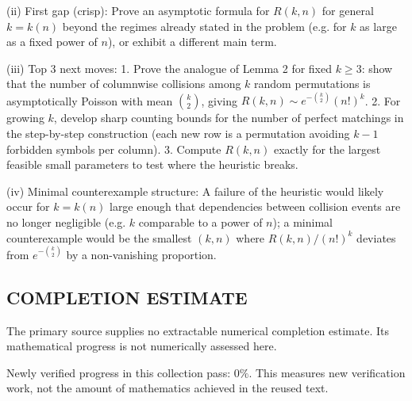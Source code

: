 (ii) First gap (crisp): Prove an asymptotic formula for $R(k,n)$ for general $k=k(n)$ beyond the regimes already stated in the problem (e.g. for $k$ as large as a fixed power of $n$), or exhibit a different main term.

(iii) Top 3 next moves:
  1. Prove the analogue of Lemma 2 for fixed $k\ge 3$: show that the number of columnwise collisions among $k$ random permutations is asymptotically Poisson with mean $\binom{k}{2}$, giving $R(k,n)\sim e^{-\binom{k}{2}}(n!)^k$.
  2. For growing $k$, develop sharp counting bounds for the number of perfect matchings in the step-by-step construction (each new row is a permutation avoiding $k-1$ forbidden symbols per column).
  3. Compute $R(k,n)$ exactly for the largest feasible small parameters to test where the heuristic breaks.

(iv) Minimal counterexample structure: A failure of the heuristic would likely occur for $k=k(n)$ large enough that dependencies between collision events are no longer negligible (e.g. $k$ comparable to a power of $n$); a minimal counterexample would be the smallest $(k,n)$ where $R(k,n)/(n!)^k$ deviates from $e^{-\binom{k}{2}}$ by a non-vanishing proportion.




\subsection*{COMPLETION ESTIMATE}
The primary source supplies no extractable numerical completion estimate. Its mathematical progress is not numerically assessed here.

Newly verified progress in this collection pass: $0\%$. This measures new verification work, not the amount of mathematics achieved in the reused text.
